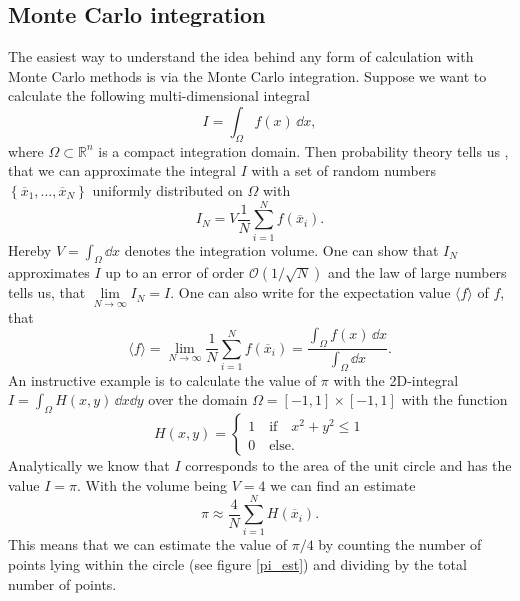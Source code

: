\subsection{Monte Carlo integration}
The easiest way to understand the idea behind any form of calculation with Monte Carlo methods is via the Monte Carlo integration. Suppose we want to calculate the following multi-dimensional integral
\begin{equation}
I=\int_{\Omega} f(x) \,\dd x,
\end{equation}
where $\Omega\subset \mathbb{R}^{n}$ is a compact integration domain. Then probability theory tells us \cite{mc_methods}, that we can approximate the integral $I$ with a set of random numbers $\left\lbrace \overline{x}_{1},\ldots,\overline{x}_{N}\right\rbrace$ uniformly distributed on $\Omega$ with
\begin{equation}
I_{N}=V \dfrac{1}{N}\sum\limits_{i=1}^{N} f(\overline{x}_{i}).
\end{equation}
Hereby $V=\int_{\Omega}\dd x$ denotes the integration volume. One can show that $I_{N}$ approximates $I$ up to an error of order $\mathcal{O}(1/\sqrt{N})$ and the law of large numbers tells us, that $\lim\limits_{N\to\infty}I_{N}=I$. One can also write for the expectation value $\langle f \rangle$ of $f$, that
\begin{equation}
\langle f \rangle = \lim\limits_{N\to\infty}\dfrac{1}{N}\sum\limits_{i=1}^{N} f(\overline{x}_{i}) = \dfrac{\int_{\Omega} f(x) \,\dd x}{\int_{\Omega}\dd x}.
\end{equation}
An instructive example is to calculate the value of $\pi$ with the 2D-integral $I=\int_{\Omega}H(x,y)\,\dd x\dd y$ over the domain $\Omega=[-1,1]\times [-1,1]$ with the function
\begin{equation}
H(x,y)=\left\lbrace \begin{array}{l}
1\quad \text{if}\quad x^2+y^2\leq 1 \\
0\quad \text{else}.
\end{array} \right.
\end{equation}
Analytically we know that $I$ corresponds to the area of the unit circle and has the value $I=\pi$. With the volume being $V=4$ we can find an estimate
\begin{equation}
\pi \approx \dfrac{4}{N} \sum\limits^{N}_{i=1}H(\overline{x}_{i}).
\end{equation}
This means that we can estimate the value of $\pi/4$ by counting the number of points lying within the circle (see figure \ref{pi_est}) and dividing by the total number of points.
